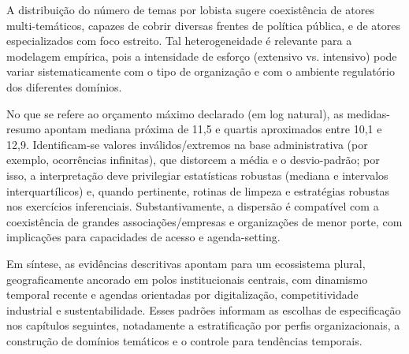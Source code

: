 A distribuição do número de temas por lobista sugere coexistência de atores multi-temáticos, capazes de cobrir diversas frentes de política pública, e de atores especializados com foco estreito. Tal heterogeneidade é relevante para a modelagem empírica, pois a intensidade de esforço (extensivo vs. intensivo) pode variar sistematicamente com o tipo de organização e com o ambiente regulatório dos diferentes domínios.

No que se refere ao orçamento máximo declarado (em log natural), as medidas-resumo apontam mediana próxima de 11,5 e quartis aproximados entre 10,1 e 12,9. Identificam-se valores inválidos/extremos na base administrativa (por exemplo, ocorrências infinitas), que distorcem a média e o desvio-padrão; por isso, a interpretação deve privilegiar estatísticas robustas (mediana e intervalos interquartílicos) e, quando pertinente, rotinas de limpeza e estratégias robustas nos exercícios inferenciais. Substantivamente, a dispersão é compatível com a coexistência de grandes associações/empresas e organizações de menor porte, com implicações para capacidades de acesso e agenda-setting.

Em síntese, as evidências descritivas apontam para um ecossistema plural, geograficamente ancorado em polos institucionais centrais, com dinamismo temporal recente e agendas orientadas por digitalização, competitividade industrial e sustentabilidade. Esses padrões informam as escolhas de especificação nos capítulos seguintes, notadamente a estratificação por perfis organizacionais, a construção de domínios temáticos e o controle para tendências temporais.

